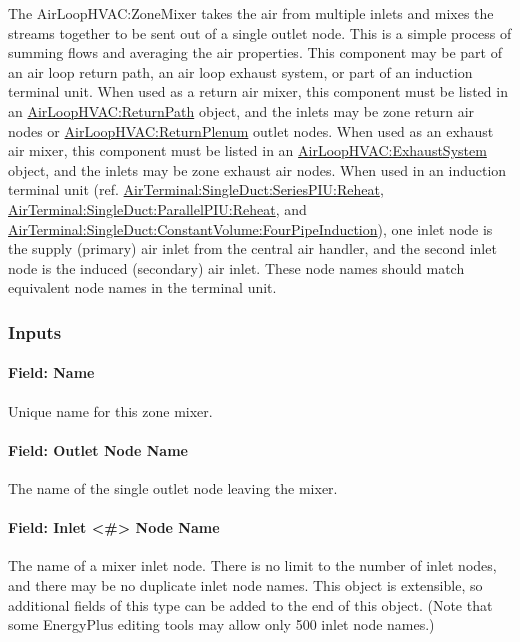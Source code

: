 The AirLoopHVAC:ZoneMixer takes the air from multiple inlets and mixes the streams together to be sent out of a single outlet node. This is a simple process of summing flows and averaging the air properties. This component may be part of an air loop return path, an air loop exhaust system, or part of an induction terminal unit. When used as a return air mixer, this component must be listed in an \hyperref[airloophvacreturnpath]{AirLoopHVAC:ReturnPath} object, and the inlets may be zone return air nodes or \hyperref[airloophvacreturnplenum]{AirLoopHVAC:ReturnPlenum} outlet nodes. When used as an exhaust air mixer, this component must be listed in an \hyperref[airloophvacexhaustsystem]{AirLoopHVAC:ExhaustSystem} object, and the inlets may be zone exhaust air nodes. When used in an induction terminal unit (ref. \hyperref[airterminalsingleductseriespiureheat]{AirTerminal:SingleDuct:SeriesPIU:Reheat}, \hyperref[airterminalsingleductparallelpiureheat]{AirTerminal:SingleDuct:ParallelPIU:Reheat}, and \hyperref[airterminalsingleductconstantvolumefourpipeinduction]{AirTerminal:SingleDuct:ConstantVolume:FourPipeInduction}), one inlet node is the supply (primary) air inlet from the central air handler, and the second inlet node is the induced (secondary) air inlet. These node names should match equivalent node names in the terminal unit.

\subsubsection{Inputs}

\paragraph{Field: Name}

Unique name for this zone mixer.

\paragraph{Field: Outlet Node Name}

The name of the single outlet node leaving the mixer.

\paragraph{Field: Inlet \textless{}\#\textgreater{} Node Name}

The name of a mixer inlet node. There is no limit to the number of inlet nodes, and there may be no duplicate inlet node names.  This object is extensible, so additional fields of this type can be added to the end of this object.  (Note that some EnergyPlus editing tools may allow only 500 inlet node names.)

